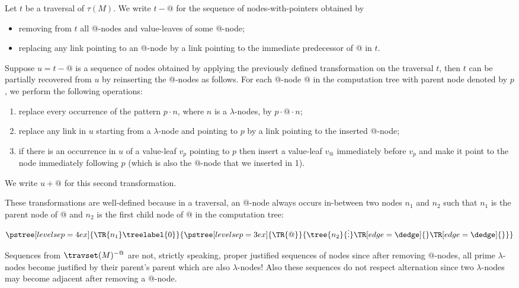 \begin{definition}
\label{dfn:appnode_filter}
Let $t$ be a traversal of $\tau(M)$.
We write $t-@$ for the sequence of nodes-with-pointers obtained by
\begin{itemize}
\item removing from $t$ all @-nodes and value-leaves of some @-node;
\item replacing any link pointing to an @-node by a link pointing to the immediate predecessor of @ in $t$.
\end{itemize}

Suppose $u = t-@$ is a sequence of nodes obtained by applying the
previously defined transformation on the traversal $t$, then $t$ can
be partially recovered from $u$ by reinserting the @-nodes as
follows. For each @-node @ in the computation tree with parent node
denoted by $p$, we perform the following operations:
\begin{enumerate}
\item replace every occurrence of the pattern $p \cdot n$, where $n$ is a $\lambda$-nodes,
by $p \cdot @ \cdot n$;
\item replace any link in $u$ starting from a $\lambda$-node and pointing to $p$ by a link pointing to the inserted @-node;
\item if there is an occurrence in $u$ of a value-leaf $v_p$ pointing to $p$ then insert a value-leaf $v_@$
immediately before $v_p$ and make it point to the node immediately
following $p$ (which is also the $@$-node that we inserted in 1).
\end{enumerate}
We write $u+@$ for this second transformation.
\end{definition}
These transformations are well-defined because in a traversal, an @-node
always occurs in-between two nodes $n_1$ and $n_2$ such that  $n_1$ is the parent node of @
and $n_2$ is the first child node of @ in the computation tree:
$$      \pstree[levelsep=4ex]{\TR{n_1}\treelabel{0} }
        {
            \pstree[levelsep=3ex]{\TR{@}}
            {
                \tree{n_2}{\vdots}
                \TR[edge=\dedge]{}
                \TR[edge=\dedge]{}
            }
        }
$$
\begin{remark}
Sequences from $\travset(M)^{-@}$ are not, strictly speaking, proper justified sequences of nodes since after removing @-nodes,
all prime $\lambda$-nodes become justified by their parent's parent which are also $\lambda$-nodes! Also these sequences do not respect alternation since two $\lambda$-nodes may become adjacent after removing a @-node.
\end{remark}


